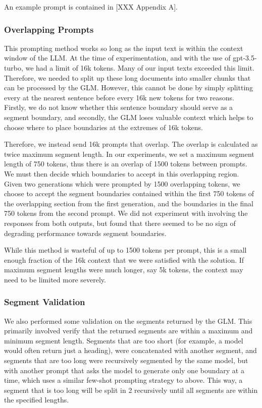 An example prompt is contained in [XXX Appendix A].

\subsubsection{Overlapping Prompts}

This prompting method works so long as the input text is within the context window of the LLM. At the time of experimentation, and with the use of gpt-3.5-turbo, we had a limit of 16k tokens. Many of our input texts exceeded this limit. Therefore, we needed to split up these long documents into smaller chunks that can be processed by the GLM. However, this cannot be done by simply splitting every at the nearest sentence before every 16k new tokens for two reasons. Firstly, we do not know whether this sentence boundary should serve as a segment boundary, and secondly, the GLM loses valuable context which helps to choose where to place boundaries at the extremes of 16k tokens.

Therefore, we instead send 16k prompts that overlap. The overlap is calculated as twice maximum segment length. In our experiments, we set a maximum segment length of 750 tokens, thus there is an overlap of 1500 tokens between prompts. We must then decide which boundaries to accept in this overlapping region. Given two generations which were prompted by 1500 overlapping tokens, we choose to accept the segment boundaries contained within the first 750 tokens of the overlapping section from the first generation, and the boundaries in the final 750 tokens from the second prompt. We did not experiment with involving the responses from both outputs, but found that there seemed to be no sign of degrading performance towards segment boundaries.

While this method is wasteful of up to 1500 tokens per prompt, this is a small enough fraction of the 16k context that we were satisfied with the solution. If maximum segment lengths were much longer, say 5k tokens, the context may need to be limited more severely.

\subsubsection{Segment Validation}

We also performed some validation on the segments returned by the GLM. This primarily involved verify that the returned segments are within a maximum and minimum segment length. Segments that are too short (for example, a model would often return just a heading), were concatenated with another segment, and segments that are too long were recursively segmented by the same model, but with another prompt that asks the model to generate only one boundary at a time, which uses a similar few-shot prompting strategy to above. This way, a segment that is too long will be split in 2 recursively until all segments are within the specified lengths.